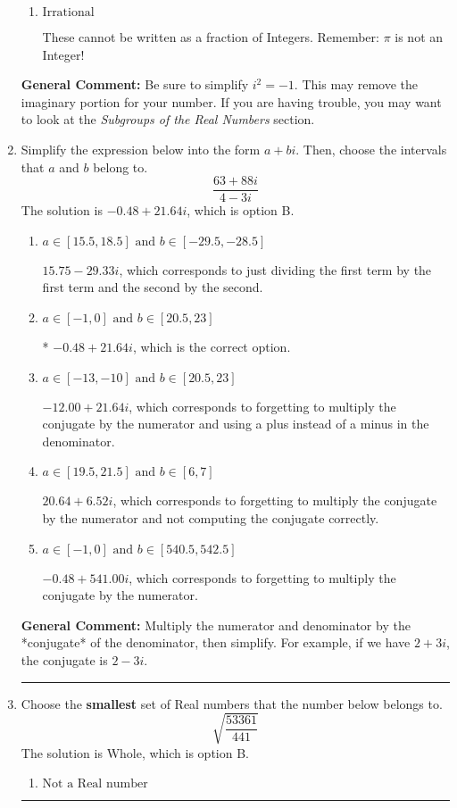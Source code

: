 \documentclass{extbook}[14pt]
\newcommand{\litem}[1]{\item #1

\rule{\textwidth}{0.4pt}}
\begin{document}
\begin{enumerate}
{\begin{enumerate}[label=\Alph*.]
These are numbers that can be written as fraction of Integers (e.g., -2/3 + 5)
\item \( \text{Irrational} \)

These cannot be written as a fraction of Integers. Remember: $\pi$ is not an Integer!
\end{enumerate}

\textbf{General Comment:} Be sure to simplify $i^2 = -1$. This may remove the imaginary portion for your number. If you are having trouble, you may want to look at the \textit{Subgroups of the Real Numbers} section.
}
\litem{
Simplify the expression below into the form $a+bi$. Then, choose the intervals that $a$ and $b$ belong to.
\[ \frac{63 + 88 i}{4 - 3 i} \]The solution is \( -0.48  + 21.64 i \), which is option B.\begin{enumerate}[label=\Alph*.]
\item \( a \in [15.5, 18.5] \text{ and } b \in [-29.5, -28.5] \)

 $15.75  - 29.33 i$, which corresponds to just dividing the first term by the first term and the second by the second.
\item \( a \in [-1, 0] \text{ and } b \in [20.5, 23] \)

* $-0.48  + 21.64 i$, which is the correct option.
\item \( a \in [-13, -10] \text{ and } b \in [20.5, 23] \)

 $-12.00  + 21.64 i$, which corresponds to forgetting to multiply the conjugate by the numerator and using a plus instead of a minus in the denominator.
\item \( a \in [19.5, 21.5] \text{ and } b \in [6, 7] \)

 $20.64  + 6.52 i$, which corresponds to forgetting to multiply the conjugate by the numerator and not computing the conjugate correctly.
\item \( a \in [-1, 0] \text{ and } b \in [540.5, 542.5] \)

 $-0.48  + 541.00 i$, which corresponds to forgetting to multiply the conjugate by the numerator.
\end{enumerate}

\textbf{General Comment:} Multiply the numerator and denominator by the *conjugate* of the denominator, then simplify. For example, if we have $2+3i$, the conjugate is $2-3i$.
}
\litem{
Choose the \textbf{smallest} set of Real numbers that the number below belongs to.
\[ \sqrt{\frac{53361}{441}} \]The solution is \( \text{Whole} \), which is option B.\begin{enumerate}[label=\Alph*.]
\item \( \text{Not a Real number} \)


\end{enumerate}}
\end{enumerate}
\end{document}
